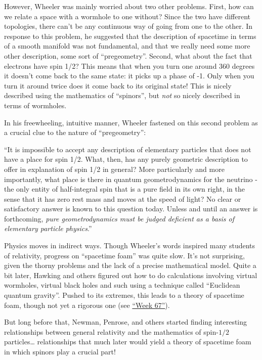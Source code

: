 \documentclass{article}
\begin{document}
However, Wheeler was mainly worried about two other problems. First, how
can we relate a space with a wormhole to one without? Since the two have
different topologies, there can't be any continuous way of going from
one to the other. In response to this problem, he suggested that the
description of spacetime in terms of a smooth manifold was not
fundamental, and that we really need some more other description, some
sort of ``pregeometry''. Second, what about the fact that electrons have
spin 1/2? This means that when you turn one around 360 degrees it
doesn't come back to the same state: it picks up a phase of -1. Only
when you turn it around twice does it come back to its original state!
This is nicely described using the mathematics of ``spinors'', but
\emph{not} so nicely described in terms of wormholes.

In his freewheeling, intuitive manner, Wheeler fastened on this second
problem as a crucial clue to the nature of ``pregeometry'':

``It is impossible to accept any description of elementary particles
that does not have a place for spin 1/2. What, then, has any purely
geometric description to offer in explanation of spin 1/2 in general?
More particularly and more importantly, what place is there in quantum
geometrodynamics for the neutrino - the only entity of half-integral
spin that is a pure field in its own right, in the sense that it has
zero rest mass and moves at the speed of light? No clear or satisfactory
answer is known to this question today. Unless and until an answer is
forthcoming, \emph{pure geometrodynamics must be judged deficient as a
basis of elementary particle physics}.''

Physics moves in indirect ways. Though Wheeler's words inspired many
students of relativity, progress on ``spacetime foam'' was quite slow.
It's not surprising, given the thorny problems and the lack of a precise
mathematical model. Quite a bit later, Hawking and others figured out
how to do calculations involving virtual wormholes, virtual black holes
and such using a technique called ``Euclidean quantum gravity''. Pushed
to its extremes, this leads to a theory of spacetime foam, though not
yet a rigorous one (see \protect\hyperlink{week67}{``Week 67''}).

But long before that, Newman, Penrose, and others started finding
interesting relationships between general relativity and the mathematics
of spin-\(1/2\) particles\ldots{} relationships that much later would
yield a theory of spacetime foam in which spinors play a crucial part!
\end{document}
